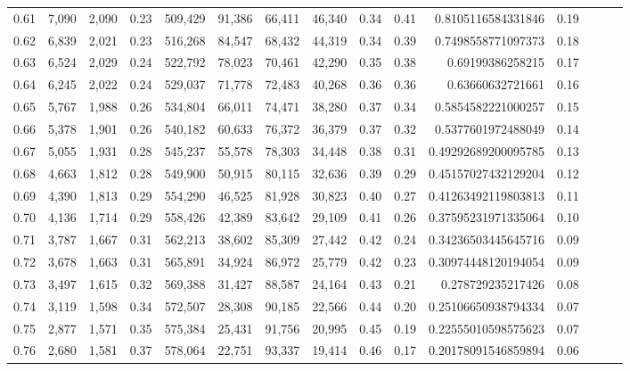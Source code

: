 \begin{tabular}{rrrrrrrrrrrrrrr}
0.61 &   7,090 &  2,090 &  0.23 &  509,429 &   91,386 &   66,411 &   46,340 &  0.34 &  0.41 &     0.8105116584331846 &      0.19 \\
0.62 &   6,839 &  2,021 &  0.23 &  516,268 &   84,547 &   68,432 &   44,319 &  0.34 &  0.39 &     0.7498558771097373 &      0.18 \\
0.63 &   6,524 &  2,029 &  0.24 &  522,792 &   78,023 &   70,461 &   42,290 &  0.35 &  0.38 &       0.69199386258215 &      0.17 \\
0.64 &   6,245 &  2,022 &  0.24 &  529,037 &   71,778 &   72,483 &   40,268 &  0.36 &  0.36 &       0.63660632721661 &      0.16 \\
0.65 &   5,767 &  1,988 &  0.26 &  534,804 &   66,011 &   74,471 &   38,280 &  0.37 &  0.34 &     0.5854582221000257 &      0.15 \\
0.66 &   5,378 &  1,901 &  0.26 &  540,182 &   60,633 &   76,372 &   36,379 &  0.37 &  0.32 &     0.5377601972488049 &      0.14 \\
0.67 &   5,055 &  1,931 &  0.28 &  545,237 &   55,578 &   78,303 &   34,448 &  0.38 &  0.31 &    0.49292689200095785 &      0.13 \\
0.68 &   4,663 &  1,812 &  0.28 &  549,900 &   50,915 &   80,115 &   32,636 &  0.39 &  0.29 &    0.45157027432129204 &      0.12 \\
0.69 &   4,390 &  1,813 &  0.29 &  554,290 &   46,525 &   81,928 &   30,823 &  0.40 &  0.27 &    0.41263492119803813 &      0.11 \\
0.70 &   4,136 &  1,714 &  0.29 &  558,426 &   42,389 &   83,642 &   29,109 &  0.41 &  0.26 &    0.37595231971335064 &      0.10 \\
0.71 &   3,787 &  1,667 &  0.31 &  562,213 &   38,602 &   85,309 &   27,442 &  0.42 &  0.24 &    0.34236503445645716 &      0.09 \\
0.72 &   3,678 &  1,663 &  0.31 &  565,891 &   34,924 &   86,972 &   25,779 &  0.42 &  0.23 &    0.30974448120194054 &      0.09 \\
0.73 &   3,497 &  1,615 &  0.32 &  569,388 &   31,427 &   88,587 &   24,164 &  0.43 &  0.21 &      0.278729235217426 &      0.08 \\
0.74 &   3,119 &  1,598 &  0.34 &  572,507 &   28,308 &   90,185 &   22,566 &  0.44 &  0.20 &    0.25106650938794334 &      0.07 \\
0.75 &   2,877 &  1,571 &  0.35 &  575,384 &   25,431 &   91,756 &   20,995 &  0.45 &  0.19 &    0.22555010598575623 &      0.07 \\
0.76 &   2,680 &  1,581 &  0.37 &  578,064 &   22,751 &   93,337 &   19,414 &  0.46 &  0.17 &    0.20178091546859894 &      0.06 \\

\end{tabular}
